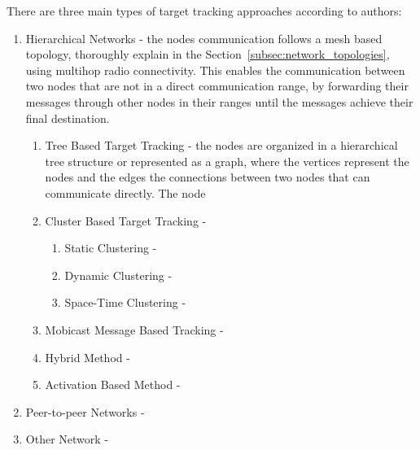 There are three main types of target tracking approaches according to \cite{Ramya2012} authors:
\begin{enumerate}
      \item Hierarchical Networks - the nodes communication follows a mesh based topology,
            thoroughly explain in the Section~\ref{subsec:network_topologies}, using multihop
            radio connectivity. This enables the communication between two nodes that are not
            in a direct communication range, by forwarding their messages through other nodes in
            their ranges until the messages achieve their final destination.
            \begin{enumerate}
                  \item Tree Based Target Tracking - the nodes are organized in a hierarchical
                        tree structure or represented as a graph, where the vertices represent the
                        nodes and the edges the connections between two nodes that can communicate
                        directly. The node
                  \item Cluster Based Target Tracking -
                        \begin{enumerate}
                              \item Static Clustering -
                              \item Dynamic Clustering -
                              \item Space-Time Clustering -
                        \end{enumerate}
                  \item Mobicast Message Based Tracking -
                  \item Hybrid Method -
                  \item Activation Based Method -
            \end{enumerate}
      \item Peer-to-peer Networks -
      \item Other Network -
\end{enumerate}




